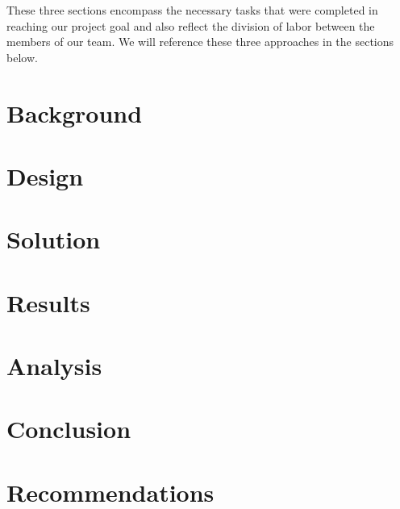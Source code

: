 \documentclass[12pt]{article}
\begin{document}
These three sections encompass the necessary tasks that were completed
in reaching our project goal and also reflect the division of labor
between the members of our team. We will reference these three
approaches in the sections below.

\section{Background}



\section{Design}


\section{Solution}


\section{Results}


\section{Analysis}


\section{Conclusion}


\section{Recommendations}
\end{document}
